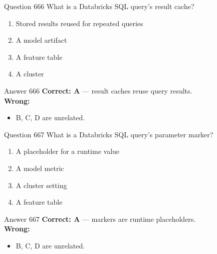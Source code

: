 \documentclass[aspectratio=169,11pt]{beamer}
\begin{document}
	\begin{frame}{Question 666}
		What is a Databricks SQL query's result cache?
		\begin{enumerate}[label=\Alph*.]
			\item Stored results reused for repeated queries
			\item A model artifact
			\item A feature table
			\item A cluster
		\end{enumerate}
	\end{frame}
	\begin{frame}{Answer 666}
		\textbf{Correct: A} --- result caches reuse query results.\\
		\vspace{0.5em}
		\textbf{Wrong:}
		\begin{itemize}
			\item B, C, D are unrelated.
		\end{itemize}
	\end{frame}
	
	\begin{frame}{Question 667}
		What is a Databricks SQL query's parameter marker?
		\begin{enumerate}[label=\Alph*.]
			\item A placeholder for a runtime value
			\item A model metric
			\item A cluster setting
			\item A feature table
		\end{enumerate}
	\end{frame}
	\begin{frame}{Answer 667}
		\textbf{Correct: A} --- markers are runtime placeholders.\\
		\vspace{0.5em}
		\textbf{Wrong:}
		\begin{itemize}
			\item B, C, D are unrelated.
		\end{itemize}
	\end{frame}
	
\end{document}
